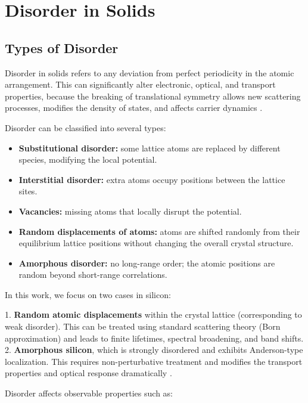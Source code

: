 \chapter{Disorder in Solids}



\section{Types of Disorder}

Disorder in solids refers to any deviation from perfect periodicity in the atomic arrangement. This can significantly alter electronic, optical, and transport properties, because the breaking of translational symmetry allows new scattering processes, modifies the density of states, and affects carrier dynamics \cite{Mahan2000,Kittel2005}.  

Disorder can be classified into several types:

\begin{itemize}
    \item \textbf{Substitutional disorder:} some lattice atoms are replaced by different species, modifying the local potential.
    \item \textbf{Interstitial disorder:} extra atoms occupy positions between the lattice sites.
    \item \textbf{Vacancies:} missing atoms that locally disrupt the potential.
    \item \textbf{Random displacements of atoms:} atoms are shifted randomly from their equilibrium lattice positions without changing the overall crystal structure.
    \item \textbf{Amorphous disorder:} no long-range order; the atomic positions are random beyond short-range correlations.
\end{itemize}

In this work, we focus on two cases in silicon:

1. \textbf{Random atomic displacements} within the crystal lattice (corresponding to weak disorder). This can be treated using standard scattering theory (Born approximation) and leads to finite lifetimes, spectral broadening, and band shifts.
2. \textbf{Amorphous silicon}, which is strongly disordered and exhibits Anderson-type localization. This requires non-perturbative treatment and modifies the transport properties and optical response dramatically \cite{Anderson1958,Economou2006,You2017}.

Disorder affects observable properties such as:

